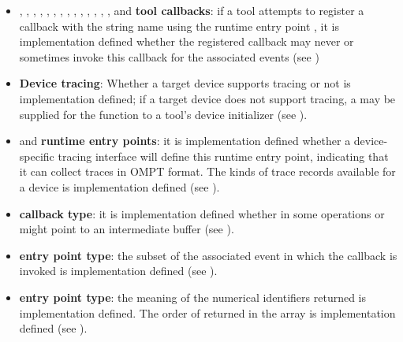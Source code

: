 \begin{itemize}
\item
{},
,
,
,
,
,
,
,
,
,
,
,
,
,
 and
\textbf{tool callbacks}: if a tool attempts to register a callback with the string name using the runtime entry point , it is implementation defined whether the registered callback may never or sometimes invoke this callback for the associated events (see )

\item \textbf{Device tracing}: Whether a target device supports tracing or not is implementation defined;
if a target device does not support tracing, a  may be supplied for the  function
to a tool's device initializer (see ).

\item {} and  \textbf{runtime entry points}: it is implementation defined whether a device-specific tracing interface will define this
runtime entry point, indicating that it can collect traces in OMPT
format.  The kinds of trace records available for a device is
implementation defined (see ).

\item {} \textbf{callback type}:
it is implementation defined whether in some operations  or  might point to an intermediate buffer
(see ).

\item {} \textbf{entry point type}: the subset
of the associated event in which the callback is invoked is
implementation defined (see ).

\item {} \textbf{entry point type}:
the meaning of the numerical identifiers returned is implementation defined.  The order of  returned in the array is implementation defined (see ).


\end{itemize}
